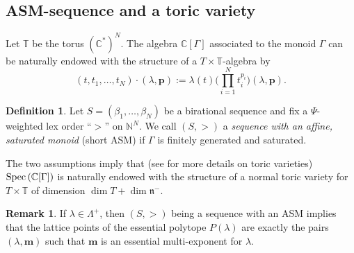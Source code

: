 \documentclass{emsprocart}
\theoremstyle{definition}
\newtheorem{definition}[theorem]{Definition}
\newtheorem{remark}[theorem]{Remark}
\begin{document}
\subsection{ASM-sequence and a toric variety}
Let $\mathbb T$ be the torus $(\mathbb C^*)^N$.
The algebra $\mathbb C[\Gamma]$ associated to the {monoid} $\Gamma$
can be naturally endowed with the structure of a $T\times \mathbb T$-algebra by
\begin{equation}\label{TACTION}
(t,t_1,\dots,t_N)\cdot (\lambda,\mathbf p):=\lambda(t)\big(\prod_{i=1}^N t_i^{p_i}\big)(\lambda,\mathbf p).
\end{equation}
\begin{definition}
Let $S=(\beta_1,\ldots,\beta_N)$ be a birational sequence and fix a $\Psi$-weighted lex order ``$>$'' on $\mathbb N^N$.
We call $(S,>)$ a {\it sequence with an affine, saturated monoid} (short ASM) 
if $\Gamma$ is finitely generated and saturated.
\end{definition}
The two assumptions imply that (see \cite{CLS} for more details on toric varieties) $\hbox{\textrm{Spec}\,} (\mathbb C[\Gamma])$ is naturally
endowed with the structure of a normal toric variety for $T\times \mathbb T$ of dimension $\dim T+\dim \mathfrak n^-$.

\begin{remark}
If $\lambda\in\Lambda^+$, then $(S,>)$ being a sequence with an ASM implies that the lattice points of the essential polytope $P(\lambda)$ are exactly the pairs $(\lambda,\mathbf m)$ such that $\mathbf m$ is an essential multi-exponent for $\lambda$.
\end{remark}
\end{document}
